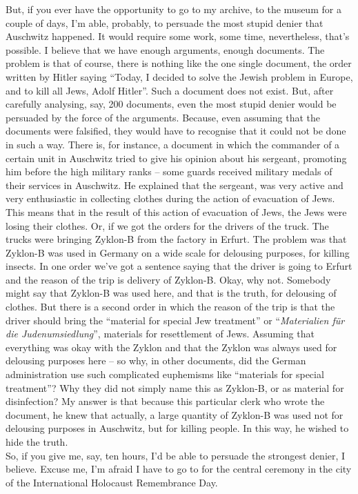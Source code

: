 But, if you ever have the opportunity to go to my archive, to the museum for a couple of days, I’m able, probably, to persuade the most stupid denier that Auschwitz happened. It would require some work, some time, nevertheless, that’s possible. I believe that we have enough arguments, enough documents. The problem is that of course, there is nothing like the one single document, the order written by Hitler saying ``Today, I decided to solve the Jewish problem in Europe, and to kill all Jews, Adolf Hitler''. Such a document does not exist. But, after carefully analysing, say, 200 documents, even the most stupid denier would be persuaded by the force of the arguments. Because, even assuming that the documents were falsified, they would have to recognise that it could not be done in such a way. There is, for instance, a document in which the commander of a certain unit in Auschwitz tried to give his opinion about his sergeant, promoting him before the high military ranks – some guards received military medals of their services in Auschwitz. He explained that the sergeant, was very active and very enthusiastic in collecting clothes during the action of evacuation of Jews. This means that in the result of this action of evacuation of Jews, the Jews were losing their clothes. Or, if we got the orders for the drivers of the truck. The trucks were bringing Zyklon-B from the factory in Erfurt. The problem was that Zyklon-B was used in Germany on a wide scale for delousing purposes, for killing insects. In one order we’ve got a sentence saying that the driver is going to Erfurt and the reason of the trip is delivery of Zyklon-B. Okay, why not. Somebody might say that Zyklon-B was used here, and that is the truth, for delousing of clothes. But there is a second order in which the reason of the trip is that the driver should bring the ``material for special Jew treatment'' or ``\textit{Materialien für die Judenumsiedlung}'', materials for resettlement of Jews. Assuming that everything was okay with the Zyklon and that the Zyklon was always used for delousing purposes here – so why, in other documents, did the German administration use such complicated euphemisms like ``materials for special treatment''? Why they did not simply name this as Zyklon-B, or as material for disinfection? My answer is that because this particular clerk who wrote the document, he knew that actually, a large quantity of Zyklon-B was used not for delousing purposes in Auschwitz, but for killing people. In this way, he wished to hide the truth. \\
So, if you give me, say, ten hours, I’d be able to persuade the strongest denier, I believe. Excuse me, I’m afraid I have to go to for the central ceremony in the city of the International Holocaust Remembrance Day.
